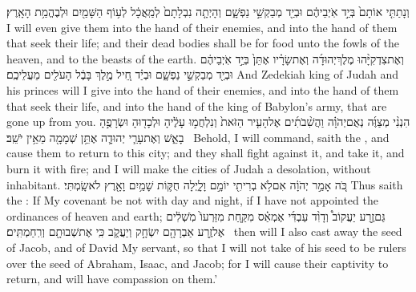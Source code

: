 {וְנָתַתִּ֤י אוֹתָם֙ בְּיַ֣ד אֹֽיְבֵיהֶ֔ם וּבְיַ֖ד מְבַקְשֵׁ֣י נַפְשָׁ֑ם וְהָיְתָ֤ה נִבְלָתָם֙ לְמַֽאֲכָ֔ל לְע֥וֹף הַשָּׁמַ֖יִם וּלְבֶהֱמַ֥ת הָאָֽרֶץ׃}
{I will even give them into the hand of their enemies, and into the hand of them that seek their life; and their dead bodies shall be for food unto the fowls of the heaven, and to the beasts of the earth.}
{וְאֶת\maqqaf צִדְקִיָּ֨הוּ מֶלֶךְ\maqqaf יְהוּדָ֜ה וְאֶת\maqqaf שָׂרָ֗יו אֶתֵּן֙ בְּיַ֣ד אֹֽיְבֵיהֶ֔ם וּבְיַ֖ד מְבַקְשֵׁ֣י נַפְשָׁ֑ם וּבְיַ֗ד חֵ֚יל מֶ֣לֶךְ בָּבֶ֔ל הָעֹלִ֖ים מֵעֲלֵיכֶֽם׃}
{And Zedekiah king of Judah and his princes will I give into the hand of their enemies, and into the hand of them that seek their life, and into the hand of the king of Babylon’s army, that are gone up from you.}
{הִנְנִ֨י מְצַוֶּ֜ה נְאֻם\maqqaf יְהֹוָ֗ה וַהֲשִׁ֨בֹתִ֜ים אֶל\maqqaf הָעִ֤יר הַזֹּאת֙ וְנִלְחֲמ֣וּ עָלֶ֔יהָ וּלְכָד֖וּהָ וּשְׂרָפֻ֣הָ בָאֵ֑שׁ וְאֶת\maqqaf עָרֵ֧י יְהוּדָ֛ה אֶתֵּ֥ן שְׁמָמָ֖ה מֵאֵ֥ין יֹשֵֽׁב׃ \petucha }
{Behold, I will command, saith the \lord, and cause them to return to this city; and they shall fight against it, and take it, and burn it with fire; and I will make the cities of Judah a desolation, without inhabitant.}
\setcounter{chap}{33}
\setcounter{verse}{25}
{כֹּ֚ה אָמַ֣ר יְהֹוָ֔ה אִם\maqqaf לֹ֥א בְרִיתִ֖י יוֹמָ֣ם וָלָ֑יְלָה חֻקּ֛וֹת שָׁמַ֥יִם וָאָ֖רֶץ לֹא\maqqaf שָֽׂמְתִּי׃}
{Thus saith the \lord: If My covenant be not with day and night, if I have not appointed the ordinances of heaven and earth;}
{גַּם\maqqaf זֶ֣רַע יַעֲקוֹב֩ וְדָוִ֨ד עַבְדִּ֜י אֶמְאַ֗ס מִקַּ֤חַת מִזַּרְעוֹ֙ מֹֽשְׁלִ֔ים אֶל\maqqaf זֶ֥רַע אַבְרָהָ֖ם יִשְׂחָ֣ק וְיַעֲקֹ֑ב כִּֽי\maqqaf {} אֶת\maqqaf שְׁבוּתָ֖ם וְרִֽחַמְתִּֽים׃ \petucha }
{then will I also cast away the seed of Jacob, and of David My servant, so that I will not take of his seed to be rulers over the seed of Abraham, Isaac, and Jacob; for I will cause their captivity to return, and will have compassion on them.’}
\label{haft_19}
